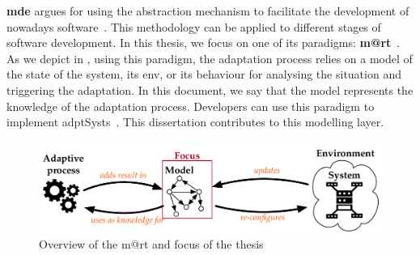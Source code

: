 \textbf{\Gls{mde}} argues for using the abstraction mechanism to facilitate the development of nowadays software~\cite{DBLP:journals/computer/Schmidt06, DBLP:conf/ifm/Kent02, DBLP:series/synthesis/2017Brambilla}.
This methodology can be applied to different stages of software development.
In this thesis, we focus on one of its paradigms: \textbf{\gls{m@rt}}~\cite{DBLP:journals/computer/BlairBF09, DBLP:journals/computer/MorinBJFS09}.
As we depict in , using this paradigm, the adaptation process relies on a \gls{model} of the state of the system, its \gls{env}, or its \gls{behaviour} for analysing the situation and triggering the adaptation.
In this document, we say that the model represents the knowledge of the adaptation process.
Developers can use this paradigm to implement \glspl{adptSyst}~\cite{DBLP:journals/computer/MorinBJFS09, DBLP:conf/smartgridsec/0001FKNT14}.
This dissertation contributes to this modelling layer.



\begin{figure}
	\centering
	\includegraphics[width=.9\linewidth]{img/chapt-intro/context/mart-focus}
	\caption{Overview of the \gls{m@rt} and focus of the thesis}
	\label{fig:intro:context:m@rt}
\end{figure}
